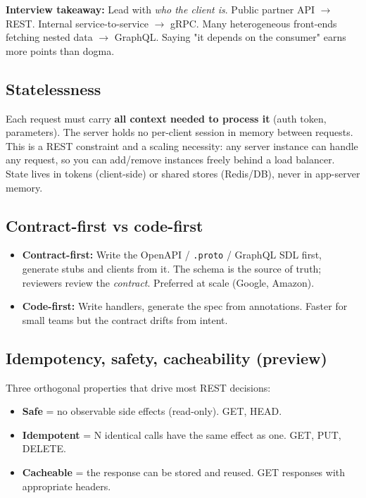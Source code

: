 \documentclass[11pt]{article}
\providecommand{\tightlist}{\setlength{\itemsep}{1pt}\setlength{\parskip}{0pt}}
\begin{document}
\textbf{Interview takeaway:} Lead with \emph{who the client is}. Public partner API \(\rightarrow\) REST. Internal service-to-service \(\rightarrow\) gRPC. Many heterogeneous front-ends fetching nested data \(\rightarrow\) GraphQL. Saying "it depends on the consumer" earns more points than dogma.

\subsection{Statelessness}\label{statelessness}

Each request must carry \textbf{all context needed to process it} (auth token, parameters). The server holds no per-client session in memory between requests. This is a REST constraint and a scaling necessity: any server instance can handle any request, so you can add/remove instances freely behind a load balancer. State lives in tokens (client-side) or shared stores (Redis/DB), never in app-server memory.

\subsection{Contract-first vs code-first}\label{contract-first-vs-code-first}

\begin{itemize}
\tightlist
\item
  \textbf{Contract-first:} Write the OpenAPI / \texttt{.proto} / GraphQL SDL first, generate stubs and clients from it. The schema is the source of truth; reviewers review the \emph{contract}. Preferred at scale (Google, Amazon).
\item
  \textbf{Code-first:} Write handlers, generate the spec from annotations. Faster for small teams but the contract drifts from intent.
\end{itemize}

\subsection{Idempotency, safety, cacheability (preview)}\label{idempotency-safety-cacheability-preview}

Three orthogonal properties that drive most REST decisions:

\begin{itemize}
\tightlist
\item
  \textbf{Safe} = no observable side effects (read-only). GET, HEAD.
\item
  \textbf{Idempotent} = N identical calls have the same effect as one. GET, PUT, DELETE.
\item
  \textbf{Cacheable} = the response can be stored and reused. GET responses with appropriate headers.
\end{itemize}
\end{document}
